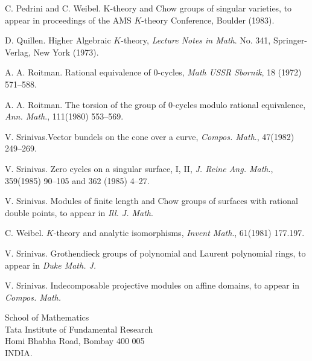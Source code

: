 \begin{thebibliography}{ABCDEFGHI}
{C. Pedrini and C. Weibel}. K-theory and Chow groups of singular varieties, to appear in proceedings of the AMS $K$-theory Conference, Boulder (1983). 

{D. Quillen}. Higher Algebraic $K$-theory, \textit{Lecture Notes in Math}. No. 341, Springer-Verlag, New York (1973). 

{A. A. Roitman}. Rational equivalence of $0$-cycles, \textit{Math USSR Sbornik}, 18 (1972) 571--588. 

{A. A. Roitman}. The torsion of the group of $0$-cycles modulo rational equivalence, \textit{Ann. Math}., 111(1980) 553--569.

{V. Srinivas}.\pageoriginale Vector bundels on the cone over a curve, \textit{Compos. Math}., 47(1982) 249--269.

{V. Srinivas}. Zero cycles on a singular surface, I, II, \textit{J. Reine Ang. Math}., 359(1985) 90--105 and 362 (1985) 4--27.

{V. Srinivas}. Modules of finite length and Chow groups of surfaces with rational double points, to appear in \textit{Ill. J. Math}. 

{C. Weibel}. $K$-theory and analytic isomorphisms, \textit{Invent Math}., 61(1981) 177.197.

{V. Srinivas}. Grothendieck groups of polynomial and Laurent polynomial rings, to appear in \textit{Duke Math. J. }

{V. Srinivas}. Indecomposable projective modules on affine domains, to appear in \textit{Compos. Math.}
\end{thebibliography}

\vskip 1cm

\noindent
School of Mathematics\\
Tata Institute of Fundamental Research\\
Homi Bhabha Road,
Bombay 400 005\\
INDIA.
